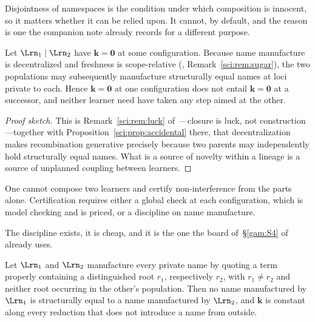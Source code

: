 Disjointness of namespaces is the condition under which composition is innocent, so it matters
whether it can be relied upon. It cannot, by default, and the reason is one the companion note
already records for a different purpose.

\begin{proposition}\label{com:prop:unstable}
Let $\Lrn_1 \mid \Lrn_2$ have $\mathbf{k} = \mathbf{0}$ at some configuration. Because name
manufacture is decentralized and freshness is scope-relative (\chSci, Remark~\ref{sci:rem:sugar}), the two
populations may subsequently manufacture structurally equal names at loci private to each. Hence
$\mathbf{k} = \mathbf{0}$ at one configuration does not entail $\mathbf{k} = \mathbf{0}$ at a
successor, and neither learner need have taken any step aimed at the other.
\end{proposition}

\begin{proof}[Proof sketch]
This is Remark~\ref{sci:rem:luck} of~\chSci---closure is luck, not construction---together with
Proposition~\ref{sci:prop:accidental} there, that decentralization makes recombination generative precisely because two
parents may independently hold structurally equal names. What is a source of novelty within a
lineage is a source of unplanned coupling between learners.
\end{proof}

\begin{corollary}\label{com:there-no-modular-composition}
One cannot compose two learners and certify non-interference from the parts alone. Certification
requires either a global check at each configuration, which is model checking and is priced, or a
discipline on name manufacture.
\end{corollary}

The discipline exists, it is cheap, and it is the one the board of~\S\ref{gam:S4} of \chGame already uses.

\begin{proposition}\label{com:prop:root}
Let $\Lrn_1$ and $\Lrn_2$ manufacture every private name by quoting a term properly containing a
distinguished root $r_1$, respectively $r_2$, with $r_1 \neq r_2$ and neither root occurring in
the other's population. Then no name manufactured by $\Lrn_1$ is structurally equal to a name
manufactured by $\Lrn_2$, and $\mathbf{k}$ is constant along every reduction that does not
introduce a name from outside.
\end{proposition}

